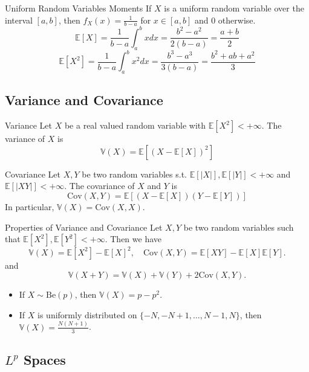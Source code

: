 \documentclass[11pt, a4paper]{article}
\begin{document}
\begin{example}{Uniform Random Variables Moments}{}
If $X$ is a uniform random variable over the interval $[a, b]$, then $f_X(x) = \frac{1}{b-a}$ for $x \in [a,b]$ and $0$ otherwise.
\[ \mathbb{E}[X] = \frac{1}{b - a} \int_a^b x dx = \frac{b^2 - a^2}{2(b - a)} = \frac{a + b}{2} \]
\[ \mathbb{E}[X^2] = \frac{1}{b - a} \int_a^b x^2 dx = \frac{b^3 - a^3}{3(b - a)} = \frac{b^2 + ab + a^2}{3} \]
\end{example}

\subsection{Variance and Covariance}

\begin{definition}{Variance}{}
Let $X$ be a real valued random variable with $\mathbb{E}[X^2] < +\infty$. The variance of $X$ is
\[ \mathbb{V}(X) = \mathbb{E}[(X - \mathbb{E}[X])^2] \]
\end{definition}

\begin{definition}{Covariance}{}
Let $X, Y$ be two random variables s.t. $\mathbb{E}[|X|], \mathbb{E}[|Y|] < +\infty$ and $\mathbb{E}[|XY|] < +\infty$. The covariance of $X$ and $Y$ is
\[ \text{Cov}(X, Y) = \mathbb{E}[(X - \mathbb{E}[X])(Y - \mathbb{E}[Y])] \]
In particular, $\mathbb{V}(X) = \text{Cov}(X, X)$.
\end{definition}

\begin{proposition}{Properties of Variance and Covariance}{}
Let $X, Y$ be two random variables such that $\mathbb{E}[X^2], \mathbb{E}[Y^2] < +\infty$. Then we have
\[ \mathbb{V}(X) = \mathbb{E}[X^2] - \mathbb{E}[X]^2, \quad \text{Cov}(X, Y) = \mathbb{E}[XY] - \mathbb{E}[X]\mathbb{E}[Y]. \]
and
\[ \mathbb{V}(X + Y) = \mathbb{V}(X) + \mathbb{V}(Y) + 2\text{Cov}(X, Y). \]
\begin{itemize}
    \item If $X \sim \text{Be}(p)$, then $\mathbb{V}(X) = p - p^2$.
    \item If $X$ is uniformly distributed on $\{-N, -N + 1, \dots, N - 1, N\}$, then $\mathbb{V}(X) = \frac{N(N + 1)}{3}$.
\end{itemize}
\end{proposition}

\subsection{\texorpdfstring{$L^p$}{Lp} Spaces}
\end{document}
